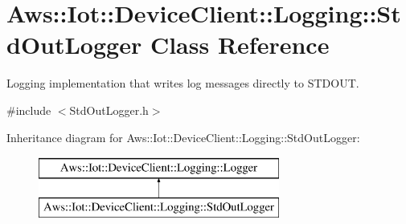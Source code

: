 \hypertarget{class_aws_1_1_iot_1_1_device_client_1_1_logging_1_1_std_out_logger}{}\section{Aws\+:\+:Iot\+:\+:Device\+Client\+:\+:Logging\+:\+:Std\+Out\+Logger Class Reference}
\label{class_aws_1_1_iot_1_1_device_client_1_1_logging_1_1_std_out_logger}


Logging implementation that writes log messages directly to S\+T\+D\+O\+UT.  




{\ttfamily \#include $<$Std\+Out\+Logger.\+h$>$}

Inheritance diagram for Aws\+:\+:Iot\+:\+:Device\+Client\+:\+:Logging\+:\+:Std\+Out\+Logger\+:\begin{figure}[H]
\begin{center}
\leavevmode
\includegraphics[height=2.000000cm]{class_aws_1_1_iot_1_1_device_client_1_1_logging_1_1_std_out_logger}
\end{center}
\end{figure}
